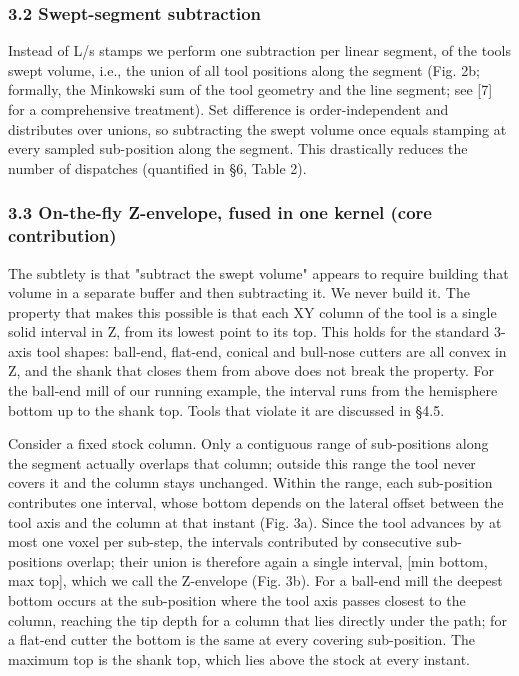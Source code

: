 \documentclass[
]{article}
\begin{document}
\hypertarget{swept-segment-subtraction}{%
\subsubsection{3.2 Swept-segment
subtraction}\label{swept-segment-subtraction}}

Instead of L/s stamps we perform one subtraction per linear segment, of
the tool\textquotesingle s swept volume, i.e., the union of all tool
positions along the segment (Fig. 2b; formally, the Minkowski sum of the
tool geometry and the line segment; see {[}7{]} for a comprehensive
treatment). Set difference is order-independent and distributes over
unions, so subtracting the swept volume once equals stamping at every
sampled sub-position along the segment. This drastically reduces the
number of dispatches (quantified in §6, Table 2).

\hypertarget{on-the-fly-z-envelope-fused-in-one-kernel-core-contribution}{%
\subsubsection{3.3 On-the-fly Z-envelope, fused in one kernel (core
contribution)}\label{on-the-fly-z-envelope-fused-in-one-kernel-core-contribution}}

The subtlety is that "subtract the swept volume" appears to require
building that volume in a separate buffer and then subtracting it. We
never build it. The property that makes this possible is that each XY
column of the tool is a single solid interval in Z, from its lowest
point to its top. This holds for the standard 3-axis tool shapes:
ball-end, flat-end, conical and bull-nose cutters are all convex in Z,
and the shank that closes them from above does not break the property.
For the ball-end mill of our running example, the interval runs from the
hemisphere bottom up to the shank top. Tools that violate it are
discussed in §4.5.

Consider a fixed stock column. Only a contiguous range of sub-positions
along the segment actually overlaps that column; outside this range the
tool never covers it and the column stays unchanged. Within the range,
each sub-position contributes one interval, whose bottom depends on the
lateral offset between the tool axis and the column at that instant
(Fig. 3a). Since the tool advances by at most one voxel per sub-step,
the intervals contributed by consecutive sub-positions overlap; their
union is therefore again a single interval, {[}min bottom, max top{]},
which we call the Z-envelope (Fig. 3b). For a ball-end mill the deepest
bottom occurs at the sub-position where the tool axis passes closest to
the column, reaching the tip depth for a column that lies directly under
the path; for a flat-end cutter the bottom is the same at every covering
sub-position. The maximum top is the shank top, which lies above the
stock at every instant.
\end{document}
